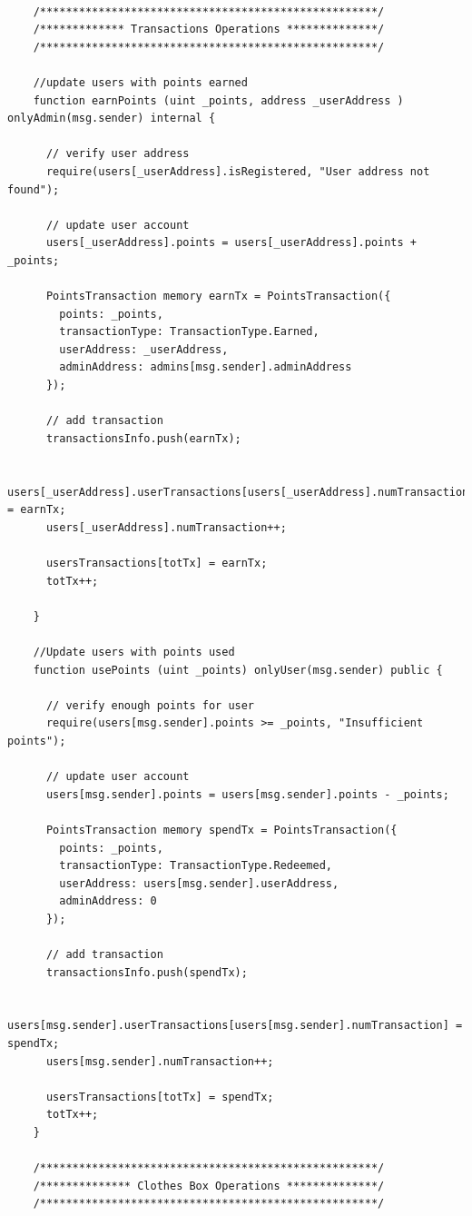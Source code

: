 \begin{lstlisting}[language=Solidity]
    
    /****************************************************/
    /************* Transactions Operations **************/
    /****************************************************/

    //update users with points earned
    function earnPoints (uint _points, address _userAddress ) onlyAdmin(msg.sender) internal {

      // verify user address
      require(users[_userAddress].isRegistered, "User address not found");

      // update user account
      users[_userAddress].points = users[_userAddress].points + _points;

      PointsTransaction memory earnTx = PointsTransaction({
        points: _points,
        transactionType: TransactionType.Earned,
        userAddress: _userAddress,
        adminAddress: admins[msg.sender].adminAddress
      });

      // add transaction
      transactionsInfo.push(earnTx);

      users[_userAddress].userTransactions[users[_userAddress].numTransaction] = earnTx;
      users[_userAddress].numTransaction++;

      usersTransactions[totTx] = earnTx;
      totTx++;

    }

    //Update users with points used
    function usePoints (uint _points) onlyUser(msg.sender) public {

      // verify enough points for user
      require(users[msg.sender].points >= _points, "Insufficient points");

      // update user account
      users[msg.sender].points = users[msg.sender].points - _points;

      PointsTransaction memory spendTx = PointsTransaction({
        points: _points,
        transactionType: TransactionType.Redeemed,
        userAddress: users[msg.sender].userAddress,
        adminAddress: 0
      });

      // add transaction
      transactionsInfo.push(spendTx);

      users[msg.sender].userTransactions[users[msg.sender].numTransaction] = spendTx;
      users[msg.sender].numTransaction++;

      usersTransactions[totTx] = spendTx;
      totTx++;
    }

    /****************************************************/
    /************** Clothes Box Operations **************/
    /****************************************************/


\end{lstlisting}
